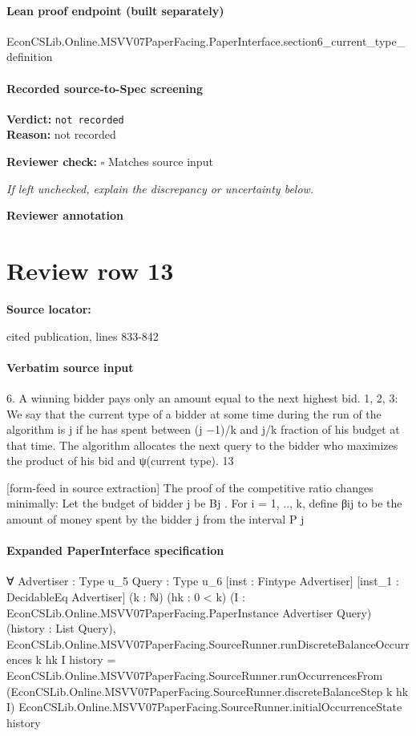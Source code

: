 \documentclass[10pt]{article}
\newcommand{\reviewerbox}{%
  \par\noindent\fbox{\parbox{0.96\linewidth}{\rule{0pt}{0.38in}}}\par
}
\newcommand{\reviewmatch}[1]{%
  \par\noindent\textbf{Reviewer check:} $\square$\; #1\par
  \noindent\emph{If left unchecked, explain the discrepancy or uncertainty below.}\par
}
\begin{document}
\paragraph{Lean proof endpoint (built separately)}\begin{ReviewVerbatim}
EconCSLib.Online.MSVV07PaperFacing.PaperInterface.section6_current_type_definition
\end{ReviewVerbatim}

\paragraph{Recorded source-to-Spec screening}
\textbf{Verdict:} \texttt{not recorded}
\\
\textbf{Reason:} not recorded
\reviewmatch{Matches source input}
\noindent\textbf{Reviewer annotation}\par
\reviewerbox
\clearpage
\hypertarget{source-claim-712b6f4e89d119c6}{}
\section*{Review row 13}
\textbf{Source locator:} {\footnotesize\raggedright cited publication, lines 833-\allowbreak{}842\par}
\paragraph{Verbatim source input}
\begin{ReviewVerbatim}
6. A winning bidder pays only an amount equal to the next highest bid.
1, 2, 3: We say that the current type of a bidder at some time during the run of the algorithm
is j if he has spent between (j −1)/k and j/k fraction of his budget at that time. The algorithm
allocates the next query to the bidder who maximizes the product of his bid and ψ(current
type).
13


[form-feed in source extraction]
The proof of the competitive ratio changes minimally: Let the budget of bidder j be Bj . For
i = 1, .., k, define βij to be the amount of money spent by the bidder j from the interval
P j
\end{ReviewVerbatim}


\paragraph{Expanded PaperInterface specification}
\begin{ReviewVerbatim}
∀ {Advertiser : Type u_5} {Query : Type u_6} [inst : Fintype Advertiser] [inst_1 : DecidableEq Advertiser] (k : ℕ)
  (hk : 0 < k) (I : EconCSLib.Online.MSVV07PaperFacing.PaperInstance Advertiser Query) (history : List Query),
  EconCSLib.Online.MSVV07PaperFacing.SourceRunner.runDiscreteBalanceOccurrences k hk I history =
    EconCSLib.Online.MSVV07PaperFacing.SourceRunner.runOccurrencesFrom
      (EconCSLib.Online.MSVV07PaperFacing.SourceRunner.discreteBalanceStep k hk I)
      EconCSLib.Online.MSVV07PaperFacing.SourceRunner.initialOccurrenceState history
\end{ReviewVerbatim}
\end{document}
